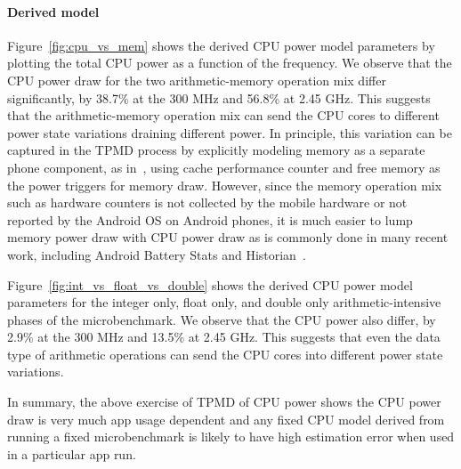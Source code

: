 \paragraph{Derived model}
Figure~\ref{fig:cpu_vs_mem} shows the derived CPU power model parameters
by plotting the total CPU power
as a function of the frequency.
We observe that the CPU power draw for the two arithmetic-memory operation mix differ significantly,
by 38.7\% at the 300 MHz and 56.8\% at 2.45 GHz.
This suggests that the arithmetic-memory operation mix can send the CPU cores
to different power state variations draining different power.
In principle, this variation can be captured in the TPMD process by  
explicitly modeling memory as a separate phone component,
as in~\cite{carroll:2010,sesame:2011}, 
using cache performance counter and free memory as the power triggers for memory draw. 
{
However, since the memory operation mix such as hardware counters is not collected by the mobile hardware 
or not reported by the Android OS on Android phones, it is much easier to lump memory power draw with CPU power draw as is commonly done in many recent work, including Android Battery Stats and Historian~\cite{androidbatterystats}. 
}

Figure~\ref{fig:int_vs_float_vs_double} shows the derived CPU power model parameters for the integer only, 
float only, and double only arithmetic-intensive phases of the microbenchmark. 
We observe that the {CPU power} also differ, 
by 2.9\% at the 300 MHz and 13.5\% at 2.45 GHz.
This suggests that even the data type of arithmetic operations
can send the CPU cores into different power state variations.

In summary, the above exercise of TPMD of CPU power shows the CPU power 
draw is very much app usage dependent and any fixed CPU model derived from
running a fixed microbenchmark is likely to have high estimation error when 
used in a particular app run. 
\fi


\fi



